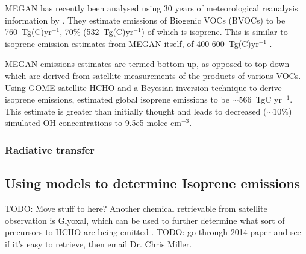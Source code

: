       MEGAN has recently been analysed using 30 years of meteorological reanalysis information by \citet{Sindelarova2014}.
      They estimate emissions of Biogenic VOCs (BVOCs) to be 760~Tg(C)yr$^{-1}$, 70\% (532~Tg(C)yr$^{-1}$) of which is isoprene.
      This is similar to isoprene emission estimates from MEGAN itself, of 400-600~Tg(C)yr$^{-1}$ \citep{Guenther2006}.
      
      MEGAN emissions estimates are termed bottom-up, as opposed to top-down which are derived from satellite measurements of the products of various VOCs.
      Using GOME satellite HCHO and a Beyesian inversion technique to derive isoprene emissions, \citet{Shim2005} estimated global isoprene emissions to be $\sim566$~TgC yr$^{-1}$. 
      This estimate is greater than initially thought and leads to decreased ($\sim10\%$) simulated OH concentrations to 9.5e5 molec cm$^{-3}$.

    \subsubsection{Radiative transfer} %
    
  \subsection{Using models to determine Isoprene emissions}
    TODO: Move stuff to here?
    Another chemical retrievable from satellite observation is Glyoxal, which can be used to further determine what sort of precursors to HCHO are being emitted \citep{Miller2014, Miller2017}.
    TODO: go through 2014 paper and see if it's easy to retrieve, then email Dr. Chris Miller.
  
